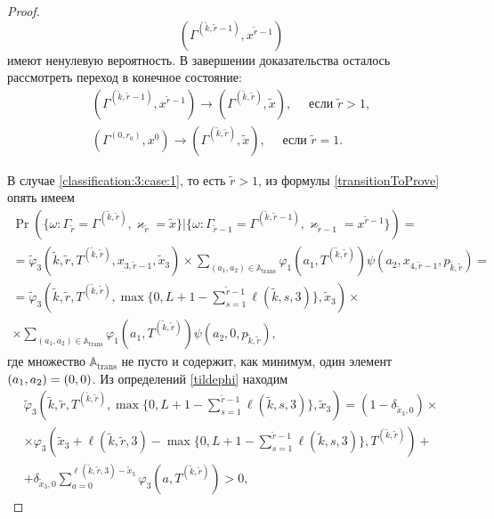 \begin{proof}
\begin{equation*}
(\Gamma^{(\tilde{k}, \tilde{r}-1)}, x^{\tilde{r} - 1}) 
\end{equation*}
имеют ненулевую вероятность. В завершении доказательства осталось рассмотреть переход в конечное состояние:
\begin{align}
    (\Gamma^{(\tilde{k}, \tilde{r}- 1)}, x^{\tilde{r} - 1})  \rightarrow (\Gamma^{(\tilde{k},  \tilde{r})},  \tilde{x}),  \quad \text{ если } \tilde{r} > 1, 
    \label{classification:3:case:1}\\
    (\Gamma^{(0, r_0)}, x^0)  \rightarrow (\Gamma^{(\tilde{k},  \tilde{r})},  \tilde{x}),  \quad \text{ если }  \tilde{r} = 1.
    \label{classification:3:case:2}
\end{align}

В случае \eqref{classification:3:case:1},  то есть $\tilde{r} > 1$,   из формулы \eqref{transitionToProve} опять имеем
\begin{multline*}
\Pr(\{\omega\colon \Gamma_{\tilde{r}}=\Gamma^{(\tilde{k},  \tilde{r})},  \varkappa_{\tilde{r}}=\tilde{x}\}|
\{\omega\colon \Gamma_{\tilde{r}-1}=\Gamma^{(\tilde{k},  \tilde{r}- 1)},  \varkappa_{\tilde{r}-1}=x^{\tilde{r}-1}\})=\\
=\widetilde{\varphi}_3(\tilde{k},  \tilde{r},  T^{(\tilde{k},  \tilde{r})},  x_{3, \tilde{r}-1},  \tilde{x}_3) 
\times
\sum_{(a_1,  a_2)\in {\mathbb A}_{\mathrm{trans}}}\varphi_1(a_1,  T^{(\tilde{k},  \tilde{r})})  \psi(a_2,  x_{4,  \tilde{r}-1},  p_{\tilde{k},  \tilde{r}})=\\
=
\widetilde{\varphi}_3(\tilde{k},  \tilde{r},  T^{(\tilde{k},  \tilde{r})},  \max{\{0,  L+1-\sum_{s=1}^{\tilde{r}-1} \ell(\tilde{k},  s,  3)\}} ,  \tilde{x}_3) 
\times \\ \times
\sum_{(a_1,  a_2)\in {\mathbb A}_{\mathrm{trans}}}\varphi_1(a_1,  T^{(\tilde{k},  \tilde{r})})  \psi(a_2,  0,  p_{\tilde{k},  \tilde{r}}), 
\end{multline*}
где множество ${\mathbb A}_{\mathrm{trans}}$ не пусто и содержит,  как минимум,  один элемент $(a_1,  a_2)\hm=(0,  0)$.
Из определений \eqref{tildephi} находим
\begin{multline*}
\widetilde{\varphi}_3(\tilde{k},  \tilde{r},  T^{(\tilde{k},  \tilde{r})},  \max{\{0,  L+1-\sum_{s=1}^{\tilde{r}-1} \ell(\tilde{k},  s,  3)\}} ,  \tilde{x}_3)= (1-\delta_{\tilde{x}_3,  0}) \times \\
\times\varphi_3(\tilde{x}_3 + \ell (\tilde{k},  \tilde{r},  3) - \max{\{0,  L+1-\sum_{s=1}^{\tilde{r}-1} \ell(\tilde{k},  s,  3)\}}, T^{(\tilde{k},  \tilde{r})} ) 
+\\+\delta_{\tilde{x}_3,  0} \sum_{a=0}^{\ell(\tilde{k},  \tilde{r},  3)-\tilde{x}_3}\varphi_3 (a,  T^{(\tilde{k},  \tilde{r})})>0, 

\end{multline*}
\end{proof}
